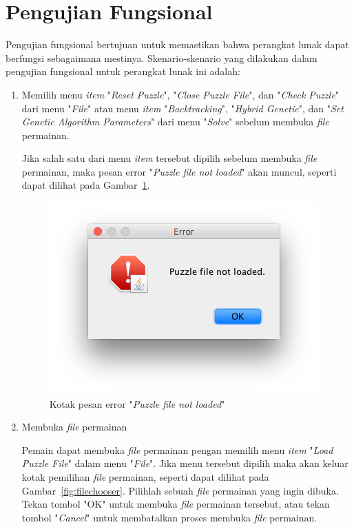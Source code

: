\section{Pengujian Fungsional}
\label{sec:pengujianfungsional}

Pengujian fungsional bertujuan untuk memastikan bahwa perangkat lunak dapat berfungsi sebagaimana mestinya. Skenario-skenario yang dilakukan dalam pengujian fungsional untuk perangkat lunak ini adalah:

\begin{enumerate}
\item Memilih menu \textit{item} "\textit{Reset Puzzle}", "\textit{Close Puzzle File}", dan "\textit{Check Puzzle}" dari menu "\textit{File}" atau menu \textit{item} "\textit{Backtracking}", "\textit{Hybrid Genetic}", dan "\textit{Set Genetic Algorithm Parameters}" dari menu "\textit{Solve}" sebelum membuka \textit{file} permainan.

Jika salah satu dari menu \textit{item} tersebut dipilih sebelum membuka \textit{file} permainan, maka pesan error "\textit{Puzzle file not loaded}" akan muncul, seperti dapat dilihat pada Gambar~\ref{fig:puzzlefilenotloaded}.

\begin{figure}
\centering
\captionsetup{justification=centering}
\includegraphics[scale=0.5]{Gambar/ImplementasiPengujian/PuzzleFileNotLoaded.png}
\caption[Kotak pesan error "\textit{Puzzle file not loaded}"]{Kotak pesan error "\textit{Puzzle file not loaded}"}
\label{fig:puzzlefilenotloaded}
\end{figure}

\item Membuka \textit{file} permainan

Pemain dapat membuka \textit{file} permainan pengan memilih menu \textit{item} "\textit{Load Puzzle File}" dalam menu "\textit{File}". Jika menu tersebut dipilih maka akan keluar kotak pemilihan \textit{file} permainan, seperti dapat dilihat pada Gambar~\ref{fig:filechooser}. Pilihlah sebuah \textit{file} permainan yang ingin dibuka. Tekan tombol "OK" untuk membuka \textit{file} permainan tersebut, atau tekan tombol "\textit{Cancel}" untuk membatalkan proses membuka \textit{file} permainan.


\end{enumerate}
